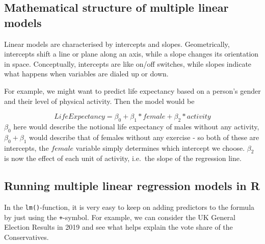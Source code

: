 \documentclass[
]{book}
\begin{document}
\hypertarget{mathematical-structure-of-multiple-linear-models}{%
\subsection{Mathematical structure of multiple linear models}\label{mathematical-structure-of-multiple-linear-models}}

Linear models are characterised by intercepts and slopes. Geometrically,
intercepts shift a line or plane along an axis, while a slope changes
its orientation in space. Conceptually, intercepts are like on/off
switches, while slopes indicate what happens when variables are dialed
up or down.

For example, we might want to predict life expectancy based on a
person's gender and their level of physical activity. Then the model
would be

\[LifeExpectancy=\beta_{0} +  \beta_{1}*female + \beta_{2}*activity\]
\(\beta_{0}\) here would describe the notional life expectancy of males
without any activity, \(\beta_{0}+\beta_{1}\) would describe that of
females without any exercise - so both of these are intercepts, the
\(female\) variable simply determines which intercept we choose.
\(\beta_{2}\) is now the effect of each unit of activity, i.e.~the slope
of the regression line.

\hypertarget{running-multiple-linear-regression-models-in-r}{%
\subsection{Running multiple linear regression models in R}\label{running-multiple-linear-regression-models-in-r}}

In the \texttt{lm()}-function, it is very easy to keep on adding predictors to
the formula by just using the \texttt{+}-symbol. For example, we can consider
the UK General Election Results in 2019 and see what helps explain the
vote share of the Conservatives.
\end{document}

